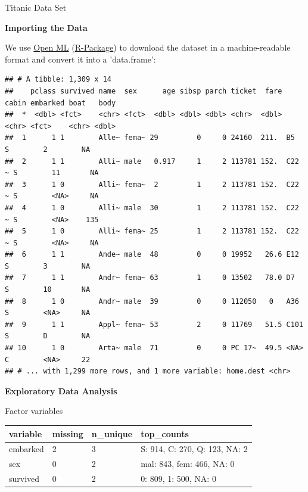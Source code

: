 \documentclass[11pt,compress,t,notes=noshow, xcolor=table]{beamer}
\makeatletter
\newenvironment{kframe}{%
 \def\at@end@of@kframe{}%
 \ifinner\ifhmode%
  \def\at@end@of@kframe{\end{minipage}}%
  \begin{minipage}{\columnwidth}%
 \fi\fi%
 \def\FrameCommand##1{\hskip\@totalleftmargin \hskip-\fboxsep
 \colorbox{shadecolor}{##1}\hskip-\fboxsep
     \hskip-\linewidth \hskip-\@totalleftmargin \hskip\columnwidth}%
 \MakeFramed {\advance\hsize-\width
   \@totalleftmargin\z@ \linewidth\hsize
   \@setminipage}}%
 {\par\unskip\endMakeFramed%
 \at@end@of@kframe}
\newenvironment{knitrout}{}{} %
\makeatother
\begin{document}
\begin{vbframe}{Titanic Data Set}
\framebreak

\textbf{Importing the Data}

We use \href{https://www.openml.org}{Open ML} (\href{https://cran.r-project.org/package=OpenML}{R-Package}) to download the dataset in a machine-readable format and convert it into a 'data.frame':




\begin{knitrout}\tiny
{}\color{fgcolor}\begin{kframe}
\begin{verbatim}
## # A tibble: 1,309 x 14
##    pclass survived name  sex      age sibsp parch ticket  fare cabin embarked boat   body
##  *  <dbl> <fct>    <chr> <fct>  <dbl> <dbl> <dbl> <chr>  <dbl> <chr> <fct>    <chr> <dbl>
##  1      1 1        Alle~ fema~ 29         0     0 24160  211.  B5    S        2        NA
##  2      1 1        Alli~ male   0.917     1     2 113781 152.  C22 ~ S        11       NA
##  3      1 0        Alli~ fema~  2         1     2 113781 152.  C22 ~ S        <NA>     NA
##  4      1 0        Alli~ male  30         1     2 113781 152.  C22 ~ S        <NA>    135
##  5      1 0        Alli~ fema~ 25         1     2 113781 152.  C22 ~ S        <NA>     NA
##  6      1 1        Ande~ male  48         0     0 19952   26.6 E12   S        3        NA
##  7      1 1        Andr~ fema~ 63         1     0 13502   78.0 D7    S        10       NA
##  8      1 0        Andr~ male  39         0     0 112050   0   A36   S        <NA>     NA
##  9      1 1        Appl~ fema~ 53         2     0 11769   51.5 C101  S        D        NA
## 10      1 0        Arta~ male  71         0     0 PC 17~  49.5 <NA>  C        <NA>     22
## # ... with 1,299 more rows, and 1 more variable: home.dest <chr>
\end{verbatim}
\end{kframe}
\end{knitrout}


\framebreak

\textbf{Exploratory Data Analysis}

Factor variables

\begin{table}[H]
\centering\begingroup\fontsize{8}{10}\selectfont

\begin{tabular}{llll}
\toprule
variable & missing & n\_unique & top\_counts\\
\midrule
embarked & 2 & 3 & S: 914, C: 270, Q: 123, NA: 2\\
sex & 0 & 2 & mal: 843, fem: 466, NA: 0\\
survived & 0 & 2 & 0: 809, 1: 500, NA: 0\\
\bottomrule
\end{tabular}\endgroup{}
\end{table}





\end{vbframe}
\end{document}
